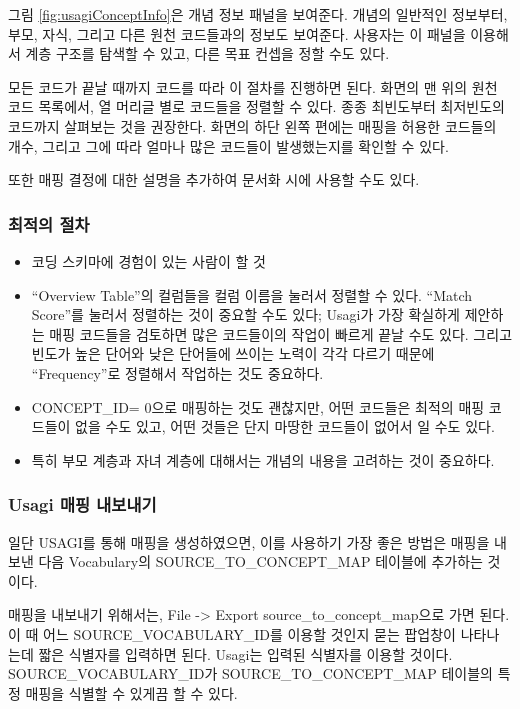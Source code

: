 \documentclass[11pt]{book}
\providecommand{\tightlist}{%
  \setlength{\itemsep}{0pt}\setlength{\parskip}{0pt}}
\theoremstyle{definition}
\theoremstyle{definition}
\theoremstyle{definition}
\theoremstyle{remark}
\begin{document}
그림 \ref{fig:usagiConceptInfo}은 개념 정보 패널을 보여준다. 개념의
일반적인 정보부터, 부모, 자식, 그리고 다른 원천 코드들과의 정보도
보여준다. 사용자는 이 패널을 이용해서 계층 구조를 탐색할 수 있고, 다른
목표 컨셉을 정할 수도 있다.

모든 코드가 끝날 때까지 코드를 따라 이 절차를 진행하면 된다. 화면의 맨
위의 원천 코드 목록에서, 열 머리글 별로 코드들을 정렬할 수 있다. 종종
최빈도부터 최저빈도의 코드까지 살펴보는 것을 권장한다. 화면의 하단 왼쪽
편에는 매핑을 허용한 코드들의 개수, 그리고 그에 따라 얼마나 많은
코드들이 발생했는지를 확인할 수 있다.

또한 매핑 결정에 대한 설명을 추가하여 문서화 시에 사용할 수도 있다.

\subsubsection*{최적의 절차}\label{-}

\begin{itemize}
\tightlist
\item
  코딩 스키마에 경험이 있는 사람이 할 것
\item
  ``Overview Table''의 컬럼들을 컬럼 이름을 눌러서 정렬할 수 있다.
  ``Match Score''를 눌러서 정렬하는 것이 중요할 수도 있다; Usagi가 가장
  확실하게 제안하는 매핑 코드들을 검토하면 많은 코드들이의 작업이 빠르게
  끝날 수도 있다. 그리고 빈도가 높은 단어와 낮은 단어들에 쓰이는 노력이
  각각 다르기 때문에 ``Frequency''로 정렬해서 작업하는 것도 중요하다.
\item
  CONCEPT\_ID= 0으로 매핑하는 것도 괜찮지만, 어떤 코드들은 최적의 매핑
  코드들이 없을 수도 있고, 어떤 것들은 단지 마땅한 코드들이 없어서 일
  수도 있다.
\item
  특히 부모 계층과 자녀 계층에 대해서는 개념의 내용을 고려하는 것이
  중요하다.
\end{itemize}

\subsubsection*{Usagi 매핑 내보내기}\label{usagi--}

일단 USAGI를 통해 매핑을 생성하였으면, 이를 사용하기 가장 좋은 방법은
매핑을 내보낸 다음 Vocabulary의 SOURCE\_TO\_CONCEPT\_MAP 테이블에
추가하는 것이다.

매핑을 내보내기 위해서는, File -\textgreater{} Export
source\_to\_concept\_map으로 가면 된다. 이 때 어느
SOURCE\_VOCABULARY\_ID를 이용할 것인지 묻는 팝업창이 나타나는데 짧은
식별자를 입력하면 된다. Usagi는 입력된 식별자를 이용할 것이다.
SOURCE\_VOCABULARY\_ID가 SOURCE\_TO\_CONCEPT\_MAP 테이블의 특정 매핑을
식별할 수 있게끔 할 수 있다.
\end{document}
